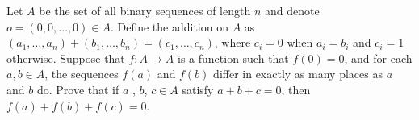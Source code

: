 Let $A$ be the set of all binary sequences of length $n$ and denote $o =(0, 0, \ldots , 0) \in A$. Define the addition on $A$ as $(a_1, \ldots , a_n)+(b_1, \ldots , b_n) =(c_1, \ldots , c_n)$, where $c_i = 0$ when $a_i = b_i$ and $c_i = 1$ otherwise. Suppose that $f\colon A \to A$ is a function such that $f(0) = 0$, and for each $a, b \in A$, the sequences $f(a)$ and $f(b)$ differ in exactly as many places as $a$ and $b$ do. Prove that if $a$ , $b$, $c \in A$ satisfy $a+ b + c = 0$, then $f(a)+ f(b) + f(c) = 0$.